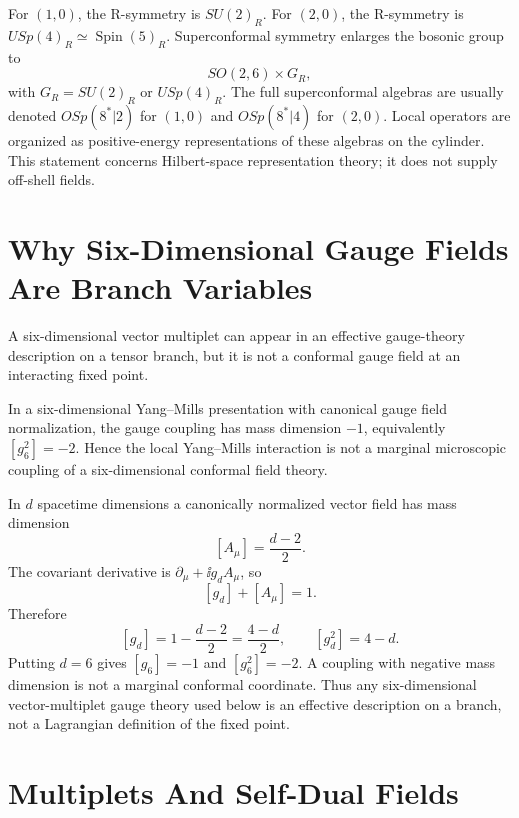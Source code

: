 For \((1,0)\), the R-symmetry is \(SU(2)_R\).  For \((2,0)\), the
R-symmetry is \(USp(4)_R\simeq \operatorname{Spin}(5)_R\).  Superconformal
symmetry enlarges the bosonic group to
\[
  SO(2,6)\times G_R ,
\]
with \(G_R=SU(2)_R\) or \(USp(4)_R\).  The full superconformal algebras are
usually denoted \(OSp(8^\ast|2)\) for \((1,0)\) and \(OSp(8^\ast|4)\) for
\((2,0)\).  Local operators are organized as positive-energy
representations of these algebras on the cylinder.  This statement concerns
Hilbert-space representation theory; it does not supply off-shell fields.

\section{Why Six-Dimensional Gauge Fields Are Branch Variables}

A six-dimensional vector multiplet can appear in an effective gauge-theory
description on a tensor branch, but it is not a conformal gauge field at an
interacting fixed point.

\begin{remark}
\label{rem:six-d-yang-mills-coupling-dimension}
In a six-dimensional Yang--Mills presentation with canonical gauge field
normalization, the gauge coupling has mass dimension \(-1\), equivalently
\([g_6^2]=-2\).  Hence the local Yang--Mills interaction is not a marginal
microscopic coupling of a six-dimensional conformal field theory.

In \(d\) spacetime dimensions a canonically normalized vector field has mass
dimension
\[
  [A_\mu]=\frac{d-2}{2}.
\]
The covariant derivative is \(\partial_\mu+\ii g_d A_\mu\), so
\[
  [g_d]+[A_\mu]=1 .
\]
Therefore
\[
  [g_d]=1-\frac{d-2}{2}=\frac{4-d}{2},
  \qquad
  [g_d^2]=4-d .
\]
Putting \(d=6\) gives \([g_6]=-1\) and \([g_6^2]=-2\).  A coupling with
negative mass dimension is not a marginal conformal coordinate.  Thus any
six-dimensional vector-multiplet gauge theory used below is an effective
description on a branch, not a Lagrangian definition of the fixed point.
\end{remark}

\section{Multiplets And Self-Dual Fields}

